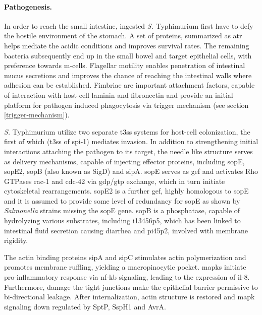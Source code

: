 \paragraph{Pathogenesis.}
In order to reach the small intestine, ingested \textit{S.} Typhimurium first have to defy the hostile environment of the stomach. A set of proteins, summarized as \gls{atr} helps mediate the acidic conditions and improves survival rates. The remaining bacteria subsequently end up in the small bowel and target epithelial cells, with preference towards \gls{m-cells}. Flagellar motility enables penetration of intestinal mucus secretions and improves the chance of reaching the intestinal walls where adhesion can be established. Fimbriae are important attachment factors, capable of interaction with host-cell laminin and fibronectin and provide an initial platform for pathogen induced phagocytosis via trigger mechanism (see section \ref{trigger-mechanism}). 

\textit{S.} Typhimurium utilize two separate \gls{t3ss} systems for host-cell colonization, the first of which (\gls{t3ss} of \acrshort{spi}-1) mediates invasion. In addition to strengthening initial interactions attaching the pathogen to its target, the needle like structure serves as delivery mechanisms, capable of injecting effector proteins, including \acrshort{sop}E, \acrshort{sop}E2, \acrshort{sop}B (also known as SigD) and \gls{sip}A. \Acrshort{sop}E serves as \gls{gef} and activates Rho GTPases \gls{rac-1} and \gls{cdc-42} via \acrshort{gdp}\slash \acrshort{gtp} exchange, which in turn initiate cytoskeletal rearrangements. \Acrshort{sop}E2 is a further \gls{gef}, highly homologous to \acrshort{sop}E and it is assumed to provide some level of redundancy for \acrshort{sop}E as shown by \textit{Salmonella} strains missing the \acrshort{sop}E gene. \Acrshort{sop}B is a phosphatase, capable of hydrolyzing various substrates, including \gls{i13456p5}, which has been linked to intestinal fluid secretion causing diarrhea and \gls{pi45p2}, involved with membrane rigidity. 

The actin binding proteins \gls{sip}A and \gls{sip}C stimulates actin polymerization and promotes membrane ruffling, yielding a macropinocytic pocket. \Glspl{mapk} initiate pro-inflammatory response via \gls{nf-kb} signaling, leading to the expression of \gls{il-8}. Furthermore, damage the tight junctions make the epithelial barrier permissive to bi-directional leakage. After internalization, actin structure is restored and \gls{mapk} signaling down regulated by SptP, SspH1 and AvrA.

